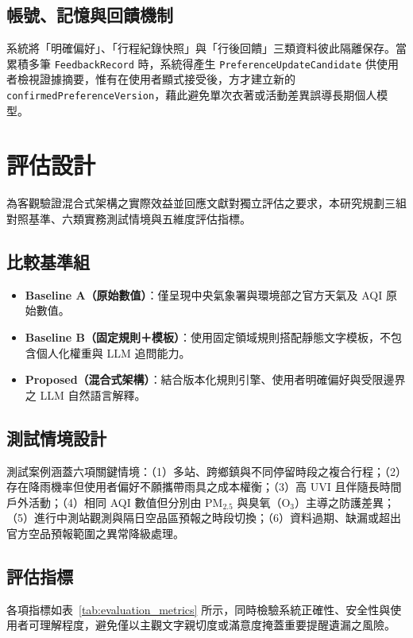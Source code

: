 \documentclass[conference]{IEEEtran}
\begin{document}
\subsection{帳號、記憶與回饋機制}
系統將「明確偏好」、「行程紀錄快照」與「行後回饋」三類資料彼此隔離保存。當累積多筆 \texttt{FeedbackRecord} 時，系統得產生 \texttt{PreferenceUpdateCandidate} 供使用者檢視證據摘要，惟有在使用者顯式接受後，方才建立新的 \texttt{confirmedPreferenceVersion}，藉此避免單次衣著或活動差異誤導長期個人模型。

\section{評估設計}

為客觀驗證混合式架構之實際效益並回應文獻對獨立評估之要求，本研究規劃三組對照基準、六類實務測試情境與五維度評估指標。

\subsection{比較基準組}
\begin{itemize}
  \item \textbf{Baseline A（原始數值）}：僅呈現中央氣象署與環境部之官方天氣及 AQI 原始數值。
  \item \textbf{Baseline B（固定規則＋模板）}：使用固定領域規則搭配靜態文字模板，不包含個人化權重與 LLM 追問能力。
  \item \textbf{Proposed（混合式架構）}：結合版本化規則引擎、使用者明確偏好與受限邊界之 LLM 自然語言解釋。
\end{itemize}

\subsection{測試情境設計}
測試案例涵蓋六項關鍵情境：（1）多站、跨鄉鎮與不同停留時段之複合行程；（2）存在降雨機率但使用者偏好不願攜帶雨具之成本權衡；（3）高 UVI 且伴隨長時間戶外活動；（4）相同 AQI 數值但分別由 PM$_{2.5}$ 與臭氧（O$_3$）主導之防護差異；（5）進行中測站觀測與隔日空品區預報之時段切換；（6）資料過期、缺漏或超出官方空品預報範圍之異常降級處理。

\subsection{評估指標}
各項指標如表~\ref{tab:evaluation_metrics} 所示，同時檢驗系統正確性、安全性與使用者可理解程度，避免僅以主觀文字親切度或滿意度掩蓋重要提醒遺漏之風險。
\end{document}
